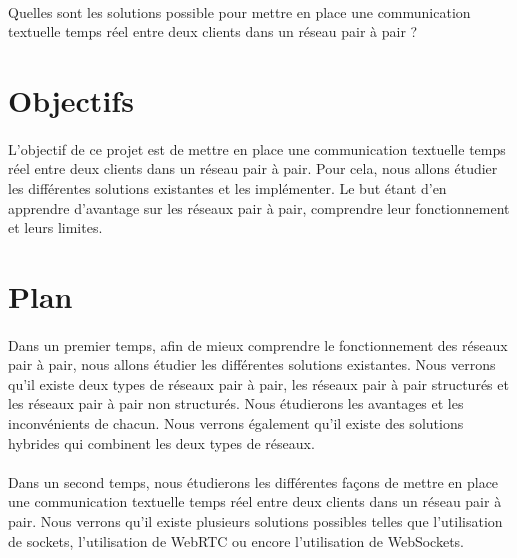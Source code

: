 \paragraph{}

Quelles sont les solutions possible pour mettre en place une communication textuelle temps réel entre deux clients dans un réseau pair à pair ?

\section{Objectifs}

\paragraph{}

L'objectif de ce projet est de mettre en place une communication textuelle temps réel entre deux clients dans un réseau pair à pair. Pour cela, nous allons étudier les différentes
solutions existantes et les implémenter. Le but étant d'en apprendre d'avantage sur les réseaux pair à pair, comprendre leur fonctionnement et leurs limites.

\section{Plan}

\paragraph{}

Dans un premier temps, afin de mieux comprendre le fonctionnement des réseaux pair à pair, nous allons étudier les différentes solutions existantes. Nous verrons qu'il existe
deux types de réseaux pair à pair, les réseaux pair à pair structurés et les réseaux pair à pair non structurés. Nous étudierons les avantages et les inconvénients de chacun.
Nous verrons également qu'il existe des solutions hybrides qui combinent les deux types de réseaux.

\paragraph{}

Dans un second temps, nous étudierons les différentes façons de mettre en place une communication textuelle temps réel entre deux clients dans un réseau pair à pair. Nous verrons
qu'il existe plusieurs solutions possibles telles que l'utilisation de sockets, l'utilisation de WebRTC ou encore l'utilisation de WebSockets.

